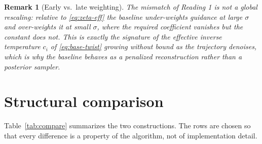 \documentclass[11pt]{article}
\newtheorem{remark}{Remark}
\begin{document}
\begin{remark}[Early vs.\ late weighting]
The mismatch of Reading 1 is not a global rescaling: relative to \eqref{eq:zeta-eff} the baseline
under-weights guidance at large $\sigma$ and over-weights it at small $\sigma$, where the required
coefficient vanishes but the constant does not. This is exactly the signature of the effective
inverse temperature $c_i$ of \eqref{eq:base-twist} growing without bound as the trajectory denoises,
which is why the baseline behaves as a penalized reconstruction rather than a posterior sampler.
\end{remark}


\section{Structural comparison}\label{sec:table}

Table~\ref{tab:compare} summarizes the two constructions. The rows are chosen so that every
difference is a property of the algorithm, not of implementation detail.
\end{document}

